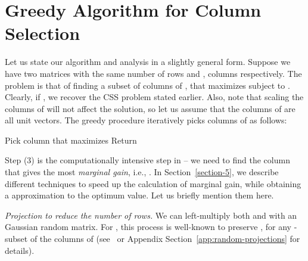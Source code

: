 \documentclass{article}
\begin{document}
\iffalse
\subsection{Overview of article}
In section 2.1, we present a ``vanilla'' greedy algorithm GREEDY for choosing  columns of a matrix  that can approximate all of 's other columns linearly. This provides intuition for our proposed algorithm ALG, presented in section 2.2. ALG is a much more efficient version of GREEDY because of three optimizations: (1) an efficient calculation of marginal gain; (2) a random projection to compress the ambient dimension of 's columns; and (3) only looking over a small random subset of all  columns in each iteration. These optimizations make analyzing ALG slightly more involved than GREEDY. To this end, we first analyze GREEDY in section 3, and then use those results to analyze ALG in section 4.
\fi


\section{Greedy Algorithm for Column Selection} \label{section-2}

Let us state our algorithm and analysis in a slightly general form. Suppose we have two matrices  with the same number of rows and ,  columns respectively. The  problem is that of finding a subset  of columns of , that maximizes  subject to .
Clearly, if , we recover the CSS problem stated earlier. Also, note that scaling the columns of  will not affect the solution, so let us assume that the columns of  are all unit vectors. The greedy procedure iteratively picks columns of  as follows:

\begin{algorithm} \label{alg:greedy}
\caption{(, , )}
\begin{algorithmic}[1]
\STATE 
\FOR{}
\STATE Pick column  that maximizes 
\STATE 
\ENDFOR
\STATE Return 
\end{algorithmic}
\end{algorithm}

Step (3) is the computationally intensive step in  -- we need to find the column that gives the most {\em marginal gain}, i.e., .  In Section~\ref{section-5}, we describe different techniques to speed up the calculation of marginal gain, while obtaining a  approximation to the optimum  value. Let us briefly mention them here. 

{\em Projection to reduce the number of rows.}  We can left-multiply both  and  with an  Gaussian random matrix.  For , this process is well-known to preserve , for any -subset of the columns of  (see~\cite{Sarlos} or Appendix Section~\ref{app:random-projections} for details).
\end{document}
